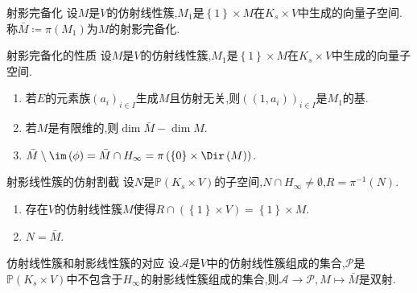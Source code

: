 \begin{definition}{射影完备化}{}
	设$M$是$V$的仿射线性簇,$M_{1}$是$\left\{1\right\}\times M$在$K_{s}\times V$中生成的向量子空间.称$\bar{M}\coloneq\pi\left(M_{1}\right)$为$M$的射影完备化.
\end{definition}

\begin{proposition}{射影完备化的性质}{}
	设$M$是$V$的仿射线性簇,$M_{1}$是$\left\{1\right\}\times M$在$K_{s}\times V$中生成的向量子空间.
	\begin{enumerate}
		\item 若$E$的元素族$\left(a_{i}\right)_{i\in I}$生成$M$且仿射无关,则$\left(\left(1,a_{i}\right)\right)_{i\in I}$是$M_{1}$的基.
		\item 若$M$是有限维的,则$\dim\bar{M}-\dim M$.
		\item $\bar{M}\setminus\im\left(\phi\right)=\bar{M}\cap H_{\infty}=\pi\left(\left\{0\right\}\times\Dir\left(M\right)\right)$.
	\end{enumerate}
\end{proposition}

\begin{proposition}{射影线性簇的仿射割截}{}
	设$N$是$\mathbb{P}\left(K_{s}\times V\right)$的子空间,$N\cap H_{\infty}\neq\emptyset$,$R=\pi^{-1}\left(N\right)$.
	\begin{enumerate}
		\item 存在$V$的仿射线性簇$M$使得$R\cap\left(\left\{1\right\}\times V\right)=\left\{1\right\}\times M$.
		\item $N=\bar{M}$.
	\end{enumerate}
\end{proposition}

\begin{theorem}{仿射线性簇和射影线性簇的对应}{}
	设$\mathcal{A}$是$V$中的仿射线性簇组成的集合,$\mathcal{P}$是$\mathbb{P}\left(K_{s}\times V\right)$中不包含于$H_{\infty}$的射影线性簇组成的集合,则$\mathcal{A}\to\mathcal{P},M\mapsto\bar{M}$是双射.
\end{theorem}

